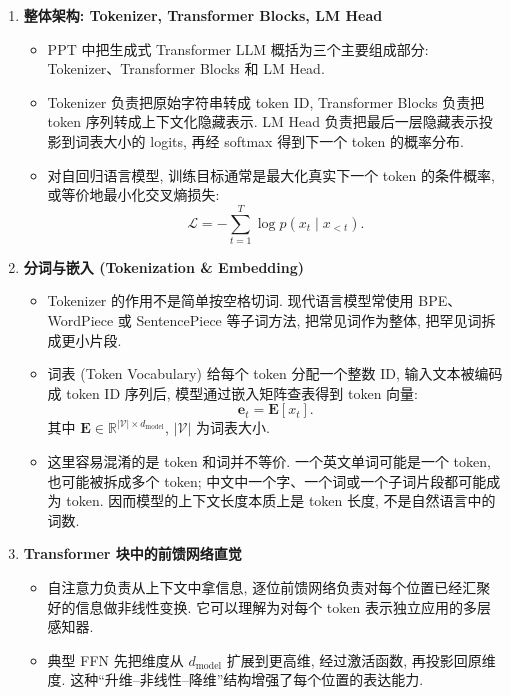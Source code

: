 \documentclass{../nndlcourse}
\begin{document}
\begin{enumerate}
  \item \textbf{整体架构: Tokenizer, Transformer Blocks, LM Head}
    \begin{itemize}
      \item PPT 中把生成式 Transformer LLM 概括为三个主要组成部分: Tokenizer、Transformer Blocks 和 LM Head.
      \item Tokenizer 负责把原始字符串转成 token ID, Transformer Blocks 负责把 token 序列转成上下文化隐藏表示. LM Head 负责把最后一层隐藏表示投影到词表大小的 logits, 再经 softmax 得到下一个 token 的概率分布.
      \item 对自回归语言模型, 训练目标通常是最大化真实下一个 token 的条件概率, 或等价地最小化交叉熵损失:
      \begin{equation*}
        \mathcal{L}
        =
        -\sum_{t=1}^{T}\log p(x_t \mid x_{<t}).
      \end{equation*}
    \end{itemize}
  \item \textbf{分词与嵌入 (Tokenization \& Embedding)}
    \begin{itemize}
      \item Tokenizer 的作用不是简单按空格切词. 现代语言模型常使用 BPE、WordPiece 或 SentencePiece 等子词方法, 把常见词作为整体, 把罕见词拆成更小片段.
      \item 词表 (Token Vocabulary) 给每个 token 分配一个整数 ID, 输入文本被编码成 token ID 序列后, 模型通过嵌入矩阵查表得到 token 向量:
      \begin{equation*}
        \boldsymbol{e}_t = \boldsymbol{E}[x_t].
      \end{equation*}
      其中 $\boldsymbol{E}\in\mathbb{R}^{|\mathcal{V}|\times d_{\mathrm{model}}}$, $|\mathcal{V}|$ 为词表大小.
      \item 这里容易混淆的是 token 和词并不等价. 一个英文单词可能是一个 token, 也可能被拆成多个 token; 中文中一个字、一个词或一个子词片段都可能成为 token. 因而模型的上下文长度本质上是 token 长度, 不是自然语言中的词数.
    \end{itemize}
  \item \textbf{Transformer 块中的前馈网络直觉}
    \begin{itemize}
      \item 自注意力负责从上下文中拿信息, 逐位前馈网络负责对每个位置已经汇聚好的信息做非线性变换. 它可以理解为对每个 token 表示独立应用的多层感知器.
      \item 典型 FFN 先把维度从 $d_{\mathrm{model}}$ 扩展到更高维, 经过激活函数, 再投影回原维度. 这种“升维--非线性--降维”结构增强了每个位置的表达能力.

\end{itemize}
\end{enumerate}
\end{document}
